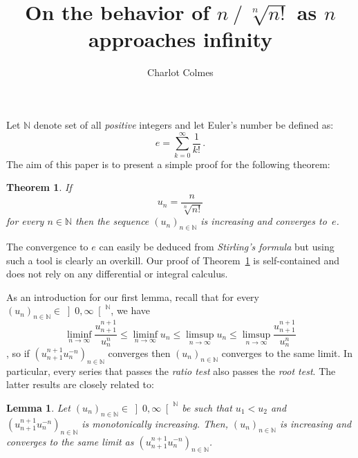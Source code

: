\documentclass[12pt,a4paper]{article}
\newcommand{\bN}{\mathbb{N}}
\newcommand{\Rpos}{\left]0, \infty\right[}
\newtheorem{theorem}{Theorem}
\newtheorem{lemma}{Lemma}
\begin{document}
\sloppy

\title{On the behavior of $n \mathbin{/} \sqrt[n]{n!}$ as $n$ approaches infinity} 
\author{Charlot Colmes}
\maketitle

Let $\bN$ denote set of all \emph{positive} integers and
let Euler's number be defined as:
$$
e = \sum_{k = 0}^\infty \frac{1}{k!} \,. 
$$
The aim of this paper is to present a simple proof for the following theorem:

\begin{theorem} \label{thm:factnn-e}
If
$$
u_n = \frac{n}{\sqrt[n]{n!}}
$$
for every $n \in \bN$ then
the sequence $\left( u_n  \right)_{n \in \bN}$ is increasing and converges to~$e$.
\end{theorem}

The convergence to $e$ can easily be deduced from \emph{Stirling's formula}
\cite{GiaquintaModicaApprox, RudinPrinciples}
but using such a tool is clearly an overkill.
Our proof of Theorem~\ref{thm:factnn-e} is self-contained and 
does not rely on any differential or integral calculus.

As an introduction for our first lemma,
recall that for every $\left( u_n \right)_{n \in \bN} \in \Rpos^\bN$, we have 
$$
\liminf_{n \to \infty} \frac{u_{n + 1}^{n + 1}}{ u_n^{n}} 
\le
\liminf_{n \to \infty} u_n 
\le
\limsup_{n \to \infty} u_n
\le 
\limsup_{n \to \infty} \frac{u_{n + 1}^{n + 1}}{u_n^{n}} 
$$
\cite{RudinPrinciples},
so if $\left( u_{n + 1}^{n + 1} u_n^{- n} \right)_{n \in \bN}$ converges then
$\left( u_n \right)_{n \in \bN}$ converges to the same limit.
In particular, every series that passes the \emph{ratio test} also passes the \emph{root test}.
The latter results are closely related to:

\begin{lemma} \label{lem:root-vs-ratio}
  Let $\left( u_n \right)_{n \in \bN}  \in \Rpos^{\bN}$ be such that
  $u_1 < u_2$ and  
  $\left(  u_{n + 1}^{n + 1}  u_n^{-n} \right)_{n \in \bN}$ is monotonically increasing.
  Then,
  $\left(u_n \right)_{n \in \bN}$ is increasing and
  converges to the same limit as $\left(  u_{n + 1}^{n + 1}  u_n^{-n} \right)_{n \in \bN}$.
\end{lemma}
\end{document}
